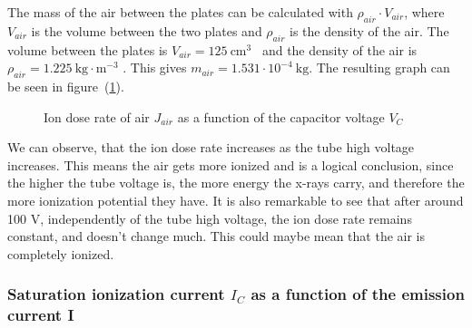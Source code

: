 \documentclass{scrartcl}
\begin{document}
\noindent The mass of the air between the plates can be calculated with $\rho_{air} \cdot V_{air}$, where $V_{air}$ is the volume between the two plates and $\rho_{air}$ is the density of the air. The volume between the plates is $V_{air} = 125 \ \text{cm}^3$~\cite{volumeCapacitor} and the density of the air is   $\rho_{air}=1.225 \ \text{kg} \cdot \text{m}^{-3}$ \cite{densityAir}. This gives $m_{air} = 1.531 \cdot 10^{-4} \ \text{kg}$. The resulting graph can be seen in figure~(\ref{fig:IonDoseRateAsFunctionOfCapacitorVoltage}).

\begin{figure}[!ht]
    \centering
    \caption{Ion dose rate of air $J_{air}$ as a function of the capacitor voltage $V_C$}
    \label{fig:IonDoseRateAsFunctionOfCapacitorVoltage}
\end{figure}
\FloatBarrier

\noindent We can observe, that the ion dose rate increases as the tube high voltage increases. This means the air gets more ionized and is a logical conclusion, since the higher the tube voltage is, the more energy the x-rays carry, and therefore the more ionization potential they have. It is also remarkable to see that after around 100 V, independently of the tube high voltage, the ion dose rate remains constant, and doesn't change much. This could maybe mean that the air is completely ionized.  

\subsubsection{Saturation ionization current $I_C$ as a function of the emission current I}
\end{document}
